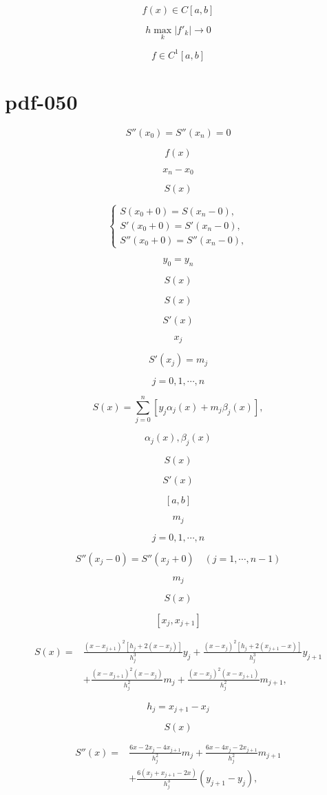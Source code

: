 \documentclass[fontset=fandol]{ctexart}
\begin{document}
\[f(x)\in C[a,b]\]

\[h\max_k|f'_k|\to0\]

\[f\in C^1[a,b]\]

\section*{pdf-050}

\[S''(x_0)=S''(x_n)=0\tag{2.8.4'}\]

\[f(x)\]

\[x_n-x_0\]

\[S(x)\]

\[\begin{cases}
S(x_0+0)=S(x_n-0),\\
S'(x_0+0)=S'(x_n-0),\\
S''(x_0+0)=S''(x_n-0),
\end{cases}\tag{2.8.5}\]

\[y_0=y_n\]

\[S(x)\]

\[S(x)\]

\[S'(x)\]

\[x_j\]

\[S'(x_j)=m_j\]

\[j=0,1,\cdots,n\]

\[S(x)=\sum_{j=0}^n[y_j\alpha_j(x)+m_j\beta_j(x)],\tag{2.8.6}\]

\[\alpha_j(x),\beta_j(x)\]

\[S(x)\]

\[S'(x)\]

\[[a,b]\]

\[m_j\]

\[j=0,1,\cdots,n\]

\[S''(x_j-0)=S''(x_j+0)\quad(j=1,\cdots,n-1)\]

\[m_j\]

\[S(x)\]

\[[x_j,x_{j+1}]\]

\[\begin{aligned}
S(x)={}&\frac{(x-x_{j+1})^2[h_j+2(x-x_j)]}{h_j^3}y_j+\frac{(x-x_j)^2[h_j+2(x_{j+1}-x)]}{h_j^3}y_{j+1}\\
&+\frac{(x-x_{j+1})^2(x-x_j)}{h_j^2}m_j+\frac{(x-x_j)^2(x-x_{j+1})}{h_j^2}m_{j+1},
\end{aligned}\tag{2.8.7}\]

\[h_j=x_{j+1}-x_j\]

\[S(x)\]

\[\begin{aligned}
S''(x)={}&\frac{6x-2x_j-4x_{j+1}}{h_j^2}m_j+\frac{6x-4x_j-2x_{j+1}}{h_j^2}m_{j+1}\\
&+\frac{6(x_j+x_{j+1}-2x)}{h_j^3}(y_{j+1}-y_j),
\end{aligned}\]
\end{document}
